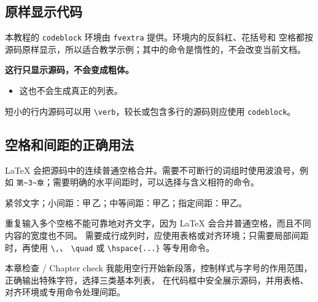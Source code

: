 \subsection{原样显示代码}

本教程的 \texttt{codeblock} 环境由 \texttt{fvextra} 提供。环境内的反斜杠、花括号和
空格都按源码原样显示，所以适合教学示例；其中的命令是惰性的，不会改变当前文档。

\begin{codeblock}
\textbf{这行只显示源码，不会变成粗体。}
\begin{itemize}
    \item 这也不会生成真正的列表。
\end{itemize}
\end{codeblock}

短小的行内源码可以用 \verb|\verb|，较长或包含多行的源码则应使用 \texttt{codeblock}。

\subsection{空格和间距的正确用法}

LaTeX 会把源码中的连续普通空格合并。需要不可断行的词组时使用波浪号，例如
\verb|第~3~章|；需要明确的水平间距时，可以选择与含义相符的命令。

\begin{resultbox}
紧邻文字；小间距：甲\,乙；中等间距：甲\quad 乙；指定间距：甲\hspace{1em}乙。
\end{resultbox}

\begin{warningbox}
重复输入多个空格不能可靠地对齐文字，因为 LaTeX 会合并普通空格，而且不同内容的宽度也不同。
需要成行成列时，应使用表格或对齐环境；只需要局部间距时，再使用 \verb|\,|、
\verb|\quad| 或 \verb|\hspace{...}| 等专用命令。
\end{warningbox}

\begin{learningbox}{本章检查 / Chapter check}
我能用空行开始新段落，控制样式与字号的作用范围，正确输出特殊字符，选择三类基本列表，
在代码框中安全展示源码，并用表格、对齐环境或专用命令处理间距。
\end{learningbox}
